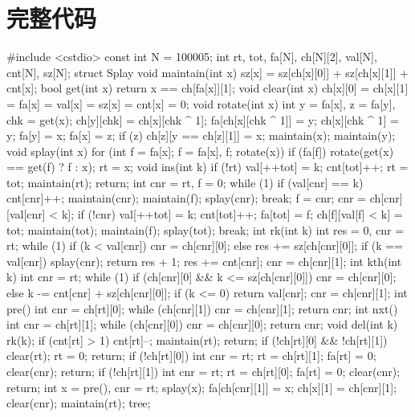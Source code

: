 \hr

\section{完整代码}

\begin{cppcode}
#include <cstdio>
const int N = 100005;
int rt, tot, fa[N], ch[N][2], val[N], cnt[N], sz[N];
struct Splay {
  void maintain(int x) { sz[x] = sz[ch[x][0]] + sz[ch[x][1]] + cnt[x]; }
  bool get(int x) { return x == ch[fa[x]][1]; }
  void clear(int x) {
    ch[x][0] = ch[x][1] = fa[x] = val[x] = sz[x] = cnt[x] = 0;
  }
  void rotate(int x) {
    int y = fa[x], z = fa[y], chk = get(x);
    ch[y][chk] = ch[x][chk ^ 1];
    fa[ch[x][chk ^ 1]] = y;
    ch[x][chk ^ 1] = y;
    fa[y] = x;
    fa[x] = z;
    if (z) ch[z][y == ch[z][1]] = x;
    maintain(x);
    maintain(y);
  }
  void splay(int x) {
    for (int f = fa[x]; f = fa[x], f; rotate(x))
      if (fa[f]) rotate(get(x) == get(f) ? f : x);
    rt = x;
  }
  void ins(int k) {
    if (!rt) {
      val[++tot] = k;
      cnt[tot]++;
      rt = tot;
      maintain(rt);
      return;
    }
    int cnr = rt, f = 0;
    while (1) {
      if (val[cnr] == k) {
        cnt[cnr]++;
        maintain(cnr);
        maintain(f);
        splay(cnr);
        break;
      }
      f = cnr;
      cnr = ch[cnr][val[cnr] < k];
      if (!cnr) {
        val[++tot] = k;
        cnt[tot]++;
        fa[tot] = f;
        ch[f][val[f] < k] = tot;
        maintain(tot);
        maintain(f);
        splay(tot);
        break;
      }
    }
  }
  int rk(int k) {
    int res = 0, cnr = rt;
    while (1) {
      if (k < val[cnr]) {
        cnr = ch[cnr][0];
      } else {
        res += sz[ch[cnr][0]];
        if (k == val[cnr]) {
          splay(cnr);
          return res + 1;
        }
        res += cnt[cnr];
        cnr = ch[cnr][1];
      }
    }
  }
  int kth(int k) {
    int cnr = rt;
    while (1) {
      if (ch[cnr][0] && k <= sz[ch[cnr][0]]) {
        cnr = ch[cnr][0];
      } else {
        k -= cnt[cnr] + sz[ch[cnr][0]];
        if (k <= 0) return val[cnr];
        cnr = ch[cnr][1];
      }
    }
  }
  int pre() {
    int cnr = ch[rt][0];
    while (ch[cnr][1]) cnr = ch[cnr][1];
    return cnr;
  }
  int nxt() {
    int cnr = ch[rt][1];
    while (ch[cnr][0]) cnr = ch[cnr][0];
    return cnr;
  }
  void del(int k) {
    rk(k);
    if (cnt[rt] > 1) {
      cnt[rt]--;
      maintain(rt);
      return;
    }
    if (!ch[rt][0] && !ch[rt][1]) {
      clear(rt);
      rt = 0;
      return;
    }
    if (!ch[rt][0]) {
      int cnr = rt;
      rt = ch[rt][1];
      fa[rt] = 0;
      clear(cnr);
      return;
    }
    if (!ch[rt][1]) {
      int cnr = rt;
      rt = ch[rt][0];
      fa[rt] = 0;
      clear(cnr);
      return;
    }
    int x = pre(), cnr = rt;
    splay(x);
    fa[ch[cnr][1]] = x;
    ch[x][1] = ch[cnr][1];
    clear(cnr);
    maintain(rt);
  }
} tree;


\end{cppcode}

